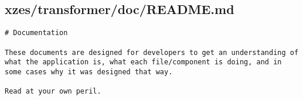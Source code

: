 \subsection{xzes/transformer/doc/README.md}
\begin{lstlisting}[caption={Context for the documentation directory.}]
# Documentation

These documents are designed for developers to get an understanding of what the application is, what each file/component is doing, and in some cases why it was designed that way.

Read at your own peril.
\end{lstlisting}
